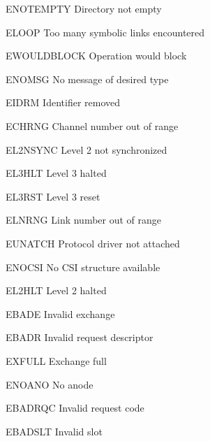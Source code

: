\begin{datadesc}{ENOTEMPTY} Directory not empty \end{datadesc}
\begin{datadesc}{ELOOP} Too many symbolic links encountered \end{datadesc}
\begin{datadesc}{EWOULDBLOCK} Operation would block \end{datadesc}
\begin{datadesc}{ENOMSG} No message of desired type \end{datadesc}
\begin{datadesc}{EIDRM} Identifier removed \end{datadesc}
\begin{datadesc}{ECHRNG} Channel number out of range \end{datadesc}
\begin{datadesc}{EL2NSYNC} Level 2 not synchronized \end{datadesc}
\begin{datadesc}{EL3HLT} Level 3 halted \end{datadesc}
\begin{datadesc}{EL3RST} Level 3 reset \end{datadesc}
\begin{datadesc}{ELNRNG} Link number out of range \end{datadesc}
\begin{datadesc}{EUNATCH} Protocol driver not attached \end{datadesc}
\begin{datadesc}{ENOCSI} No CSI structure available \end{datadesc}
\begin{datadesc}{EL2HLT} Level 2 halted \end{datadesc}
\begin{datadesc}{EBADE} Invalid exchange \end{datadesc}
\begin{datadesc}{EBADR} Invalid request descriptor \end{datadesc}
\begin{datadesc}{EXFULL} Exchange full \end{datadesc}
\begin{datadesc}{ENOANO} No anode \end{datadesc}
\begin{datadesc}{EBADRQC} Invalid request code \end{datadesc}
\begin{datadesc}{EBADSLT} Invalid slot \end{datadesc}
